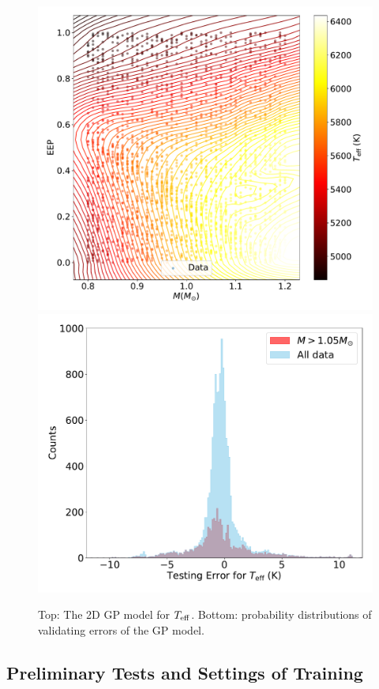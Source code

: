 \begin{figure}
	\includegraphics[width=1.0\columnwidth]{2d_GPmodel_function.pdf}
	\includegraphics[width=1.0\columnwidth]{2d_testing_hist_effective_T.pdf}	
    \caption{Top: The 2D GP model for $T_{\rm eff}$. Bottom: probability distributions of validating errors of the GP model. }  
    \label{fig:2dtest}
\end{figure}


\subsection{Preliminary Tests and Settings of Training}


